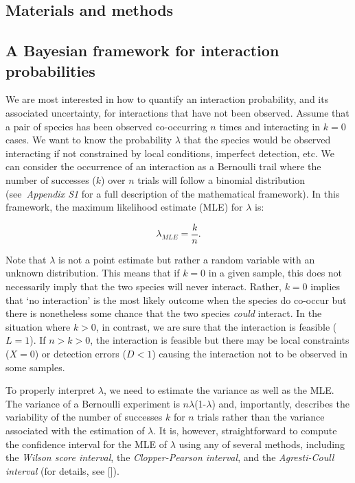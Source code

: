 \documentclass[12pt]{article}
\begin{document}
\begin{spacing}{2.0}
\section*{Materials and methods}

  \subsection*{A Bayesian framework for interaction probabilities}

    We are most interested in how to quantify an interaction probability, and its associated uncertainty, for interactions that have not been observed. Assume that a pair of species has been observed co-occurring $n$ times and interacting in $k = 0$ cases. We want to know the probability $\lambda$ that the species would be observed interacting if not constrained by local conditions, imperfect detection, etc. We can consider the occurrence of an interaction as a Bernoulli trail where the number of successes ($k$) over $n$ trials will follow a binomial distribution (see~\emph{Appendix S1} for a full description of the mathematical framework). In this framework, the maximum likelihood estimate (MLE) for $\lambda$ is:

        \begin{equation}
          \lambda_{MLE} = \frac{k}{n}  .
          \label{theta_MLE}
        \end{equation}
  

    Note that $\lambda$ is not a point estimate but rather a random variable with an unknown distribution. This means that if $k = 0$ in a given sample, this does not necessarily imply that the two species will never interact. Rather, $k = 0$ implies that `no interaction' is the most likely outcome when the species do co-occur but there is nonetheless some chance that the two species \emph{could} interact. In the situation where $k>0$, in contrast, we are sure that the interaction is feasible ($L = 1$). If $n>k>0$, the interaction is feasible but there may be local constraints ($X = 0$) or detection errors ($D<1$) causing the interaction not to be observed in some samples. 


    To properly interpret $\lambda$, we need to estimate the variance as well as the MLE. The variance of a Bernoulli experiment is $n\lambda$(1-$\lambda$) and, importantly, describes the variability of the number of successes $k$ for $n$ trials rather than the variance associated with the estimation of $\lambda$. It is, however, straightforward to compute the confidence interval for the MLE of $\lambda$ using any of several methods, including the \emph{Wilson score interval}, the \emph{Clopper-Pearson interval}, and the \emph{Agresti-Coull interval} (for details, see [\citealp{Brown2001}]). 



\end{spacing}
\end{document}
